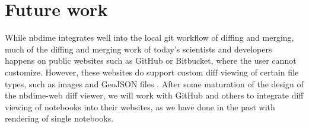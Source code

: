 \documentclass{../../Proposal/Latex-Proposal/deliverablereport}
\begin{document}


\section{Future work}

While nbdime integrates well into the local git workflow of diffing and merging,
much of the diffing and merging work of today's scientists and developers happens
on public websites such as GitHub or Bitbucket,
where the user cannot customize.
However, these websites do support custom diff viewing of certain file types,
such as images and GeoJSON files \cite{geojson-diff}.
After some maturation of the design of the nbdime-web diff viewer,
we will work with GitHub and others to integrate diff viewing of notebooks into their websites,
as we have done in the past with rendering of single notebooks.

\printbibliography
\end{document}
